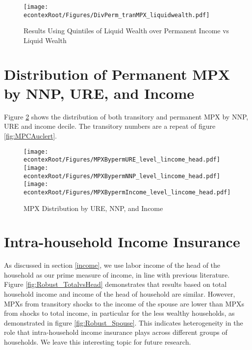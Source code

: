 \documentclass[titlepage]{\econtex}\newcommand{\texname}{ConsumptionHeterogeneity}
\begin{document}
	\begin{figure} 
		\begin{centering}
			\texttt{[image: \\econtexRoot/Figures/DivPerm\_tranMPX\_liquidwealth.pdf]}
			\caption{Results Using Quintiles of Liquid Wealth over Permanent Income vs Liquid Wealth}
			\label{fig:Robust_DivPerm}
		\end{centering}
	\end{figure}
	
	
	\section{Distribution of Permanent MPX by NNP, URE, and Income} \label{PermMPXbyURENNP}
	\setcounter{figure}{0}   
	\setcounter{table}{0} 
	Figure \ref{fig:MPCAuclert_perm} shows the distribution of both transitory and permanent MPX by NNP, URE and income decile. The transitory numbers are a repeat of figure \ref{fig:MPCAuclert}.
	\begin{figure} 
		\begin{centering}
			\texttt{[image: \\econtexRoot/Figures/MPXBypermURE\_level\_lincome\_head.pdf]}
			\texttt{[image: \\econtexRoot/Figures/MPXBypermNNP\_level\_lincome\_head.pdf]}
			\texttt{[image: \\econtexRoot/Figures/MPXBypermIncome\_level\_lincome\_head.pdf]}
			\caption{MPX Distribution by URE, NNP, and Income}
			\label{fig:MPCAuclert_perm}
		\end{centering}
	\end{figure}
	
	\section{Intra-household Income Insurance} \label{Insurance}
	\setcounter{figure}{0}   
	\setcounter{table}{0} 
	As discussed in section \ref{income}, we use labor income of the head of the household as our prime measure of income, in line with previous literature. Figure \ref{fig:Robust_TotalvsHead} demonstrates that results based on total household income and income of the head of household are similar. However, MPXs from transitory shocks to the income of the spouse are lower than MPXs from shocks to total income, in particular for the less wealthy households, as demonstrated in figure \ref{fig:Robust_Spouse}. This indicates heterogeneity in the role that intra-household income insurance plays across different groups of households. We leave this interesting topic for future research. 
	
\end{document}
